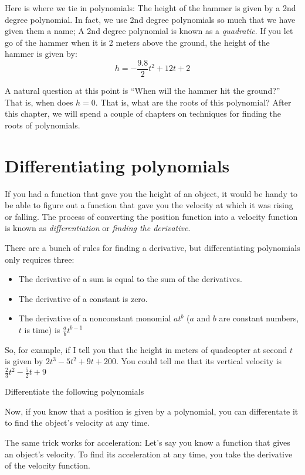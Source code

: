 Here is where we tie in polynomials: The height of the hammer is given
by a 2nd degree polynomial. In fact, we use 2nd degree polynomials so
much that we have given them a name; A 2nd degree polynomial is known
as a \emph{quadratic}. If you let go of the hammer when it is 2 meters
above the ground, the height of the hammer is given by:
\begin{equation*}
  h = -\frac{9.8}{2}t^2 + 12t + 2
\end{equation*}

A natural question at this point is ``When will the hammer hit the
ground?''  That is, when does $h = 0$. That is, what are the roots of
this polynomial? After this chapter, we will spend a couple of
chapters on techniques for finding the roots of polynomials.

\section{Differentiating polynomials}

If you had a function that gave you the height of an object, it would
be handy to be able to figure out a function that gave you the
velocity at which it was rising or falling. The process of converting
the position function into a velocity function is known as
\emph{differentiation} or \emph{finding the derivative}.

There are a bunch of rules for finding a derivative, but
differentiating polynomials only requires three:
\begin{itemize}
\item The derivative of a sum is equal to the sum of the derivatives.
\item The derivative of a constant is zero.
\item The derivative of a nonconstant monomial $at^b$ ($a$ and $b$ are constant numbers, $t$ is time) is $\frac{a}{b}t^{b-1}$ 
\end{itemize}

So, for example, if I tell you that the height in meters of quadcopter
at second $t$ is given by $2t^3 - 5t^2 + 9t + 200$. You could tell me
that its vertical velocity is $\frac{2}{3}t^{2} - \frac{5}{2}t + 9$

\begin{Exercise}[title={Differentation of polynomials}, label=diffpoly]
  Differentiate the following polynomials
\end{Exercise}
\begin{Answer}
\end{Answer}

Now, if you know that a position is given by a polynomial, you can
differentate it to find the object's velocity at any time.

The same trick works for acceleration: Let's say you know a function
that gives an object's velocity. To find its acceleration at any time,
you take the derivative of the velocity function.
